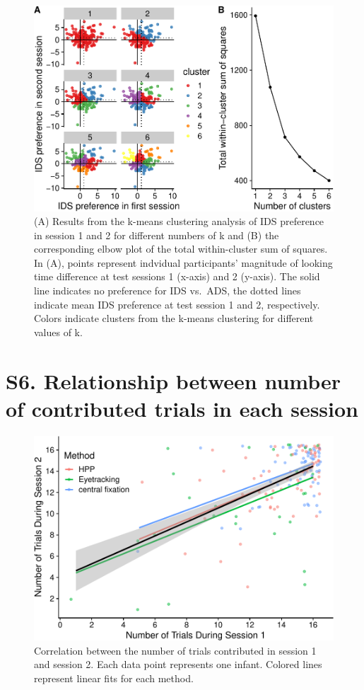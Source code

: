 \documentclass[
  man, donotrepeattitle,floatsintext]{apa6}
\begin{document}
\begin{figure}
\centering
\includegraphics{MB1T_supplement_files/figure-latex/fig3-1.pdf}
\caption{\label{fig:fig3} (A) Results from the k-means clustering analysis of IDS preference in session 1 and 2 for different numbers of k and (B) the corresponding elbow plot of the total within-cluster sum of squares. In (A), points represent indvidual participants' magnitude of looking time difference at test sessions 1 (x-axis) and 2 (y-axis). The solid line indicates no preference for IDS vs.~ADS, the dotted lines indicate mean IDS preference at test session 1 and 2, respectively. Colors indicate clusters from the k-means clustering for different values of k.}
\end{figure}

\hypertarget{s6.-relationship-between-number-of-contributed-trials-in-each-session}{%
\section{S6. Relationship between number of contributed trials in each session}\label{s6.-relationship-between-number-of-contributed-trials-in-each-session}}

\begin{figure}
\centering
\includegraphics{MB1T_supplement_files/figure-latex/sfig1-1.pdf}
\caption{\label{fig:sfig1}Correlation between the number of trials contributed in session 1 and session 2. Each data point represents one infant. Colored lines represent linear fits for each method.}
\end{figure}
\end{document}
